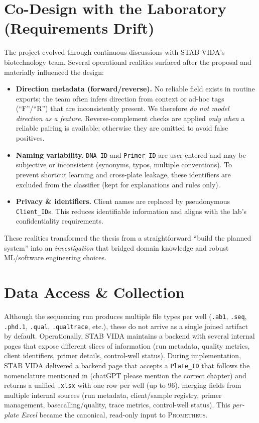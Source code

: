 \section{Co-Design with the Laboratory (Requirements Drift)}
\label{sec:codesign}
The project evolved through continuous discussions with STAB VIDA’s biotechnology team. Several operational realities surfaced after the proposal and materially influenced the design:
\begin{itemize}
  \item \textbf{Direction metadata (forward/reverse).} No reliable field exists in routine exports; the team often infers direction from context or ad-hoc tags (``F''/``R'') that are inconsistently present. We therefore \emph{do not model direction as a feature}. Reverse-complement checks are applied \emph{only when} a reliable pairing is available; otherwise they are omitted to avoid false positives.
  \item \textbf{Naming variability.} \texttt{DNA\_ID} and \texttt{Primer\_ID} are user-entered and may be subjective or inconsistent (synonyms, typos, multiple conventions). To prevent shortcut learning and cross-plate leakage, these identifiers are excluded from the classifier (kept for explanations and rules only).
  \item \textbf{Privacy \& identifiers.} Client names are replaced by pseudonymous \texttt{Client\_ID}s. This reduces identifiable information and aligns with the lab’s confidentiality requirements.
\end{itemize}
These realities transformed the thesis from a straightforward ``build the planned system'' into an \emph{investigation} that bridged domain knowledge and robust ML/software engineering choices.

\section{Data Access \& Collection}
\label{sec:impl_backend_access}

Although the sequencing run produces multiple file types per well (\texttt{.ab1}, \texttt{.seq}, \texttt{.phd.1}, \texttt{.qual}, \texttt{.qualtrace}, etc.), these do not arrive as a single joined artifact by default. Operationally, STAB VIDA maintains a backend with several internal pages that expose different slices of information (run metadata, quality metrics, client identifiers, primer details, control-well status).
During implementation, STAB VIDA delivered a backend page that accepts a \texttt{Plate\_ID} that follows the nomenclature mentioned in (chatGPT please mention the correct chapter) and returns a unified \texttt{.xlsx} with one row per well (up to 96), merging fields from multiple internal sources (run metadata, client/sample registry, primer management, basecalling/quality, trace metrics, control-well status). This \emph{per-plate Excel} became the canonical, read-only input to \textsc{Prometheus}.



